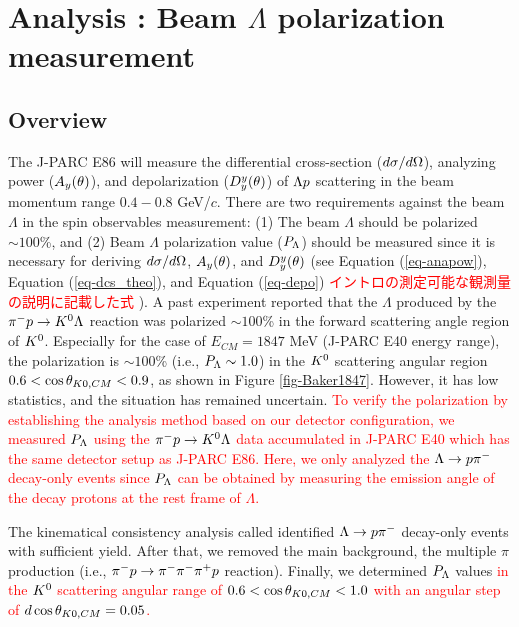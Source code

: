 %
\graphicspath{{./pictures/chapter_Pl/}}

\chapter{Analysis : Beam $\Lambda$ polarization measurement} 
\label{chap-Pl}

\section{Overview}

The J-PARC E86 will measure the differential cross-section ($d\sigma/d\Omega$), analyzing power ($A_{y}(\theta)$), and depolarization ($D^{y}_{y}(\theta)$) of $\Lambda p$ scattering in the beam momentum range $0.4-0.8$ GeV/$c$. There are two requirements against the beam $\Lambda$ in the spin observables measurement: (1) The beam $\Lambda$ should be polarized $\sim100$\%, and (2) Beam $\Lambda$ polarization value ($P_{\Lambda}$) should be measured since it is necessary for deriving $d\sigma/d\Omega$, $A_{y}(\theta)$, and $D^{y}_{y}(\theta)$ (see Equation (\ref{eq-anapow}), Equation (\ref{eq-dcs_theo}), and Equation (\ref{eq-depo}) \textcolor{red}{ イントロの測定可能な観測量の説明に記載した式 }). A past experiment \cite{Baker} reported that the $\Lambda$ produced by the $\pi^- p \to K^0 \Lambda$ reaction was polarized $\sim100$\% in the forward scattering angle region of $K^{0}$. Especially for the case of $E_{CM}=1847$ MeV (J-PARC E40 energy range), the polarization is $\sim100$\% (i.e., $P_{\Lambda}\sim1.0$) in the $K^{0}$ scattering angular region $0.6<\cos{\theta_{K0,CM}}<0.9$, as shown in Figure \ref{fig-Baker1847}. However, it has low statistics, and the situation has remained uncertain. \textcolor{red}{ To verify the polarization by establishing the analysis method based on our detector configuration, we measured $P_{\Lambda}$ using the $\pi^- p \to K^0 \Lambda$ data accumulated in J-PARC E40 which has the same detector setup as J-PARC E86. Here, we only analyzed the $\Lambda\to p\pi^{-}$ decay-only events since $P_{\Lambda}$ can be obtained by measuring the emission angle of the decay protons at the \textcolor{red}{ rest frame } of $\Lambda$. }

The kinematical consistency analysis called  identified $\Lambda\to p\pi^{-}$ decay-only events with sufficient yield. After that, we removed the main background, the multiple $\pi$ production (i.e., $\pi^- p \to \pi^-\pi^-\pi^+p$ reaction). Finally, we determined $P_{\Lambda}$ values \textcolor{red}{ in the $K^{0}$ scattering angular range of $0.6<\cos{\theta_{K0,CM}}<1.0$ with an angular step of $d\cos{\theta_{K0,CM}}=0.05$.} %

